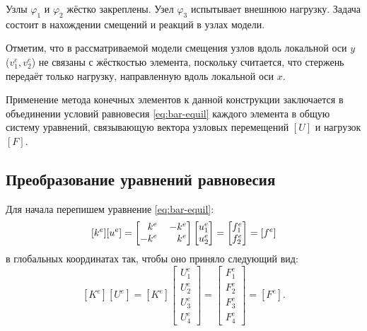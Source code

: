 \documentclass[10pt]{article}
\numberwithin{equation}{section}
\renewcommand{\phi}{\varphi}
\newcommand{\matr}[1]{[#1]}
\newcommand{\node}[1]{$\phi_{#1}$}
\newcommand{\mm}{\llap{$-$}}
\newcommand{\phm}{\phantom{-}}
\begin{document}


Узлы \node{1} и \node{2} жёстко закреплены. Узел \node{3} испытывает
внешнюю нагрузку. Задача состоит в нахождении смещений и реакций в
узлах модели.

Отметим, что в рассматриваемой модели смещения узлов вдоль локальной
оси $y$ ($v_1^e, v_2^e$) не связаны с жёсткостью элемента, поскольку
считается, что стержень передаёт только нагрузку, направленную вдоль
локальной оси $x$.

Применение метода конечных элементов к данной конструкции заключается
в объединении условий равновесия \eqref{eq:bar-equil} каждого элемента
в общую систему уравнений, связывающую вектора узловых перемещений
$\matr{U}$ и нагрузок $\matr{F}$.

\subsection{Преобразование уравнений равновесия}

Для начала перепишем уравнение \eqref{eq:bar-equil}:
\begin{equation}
  \label{eq:bar-element-equil}
  \matr{k^e}\matr{u^e}=
  \begin{bmatrix}
    \phm{}k^e&& \mm k^e\\
    -k^e && k^e    
  \end{bmatrix}
  \begin{bmatrix}
    u_1^e\\
    u_2^e
  \end{bmatrix}
  =
  \begin{bmatrix}
    f_1^e\\
    f_2^e
  \end{bmatrix}=\matr{f^e}
\end{equation}
в глобальных координатах так, чтобы оно приняло следующий вид:
\begin{equation}
  \label{eq:target-equil}
  \matr{K^e}\matr{U^e}=\matr{K^e}
  \begin{bmatrix}
    U_1^e\\
    U_2^e\\
    U_3^e\\
    U_4^e
  \end{bmatrix}
  =
  \begin{bmatrix}
    F_1^e\\
    F_2^e\\
    F_3^e\\
    F_4^e
  \end{bmatrix}=\matr{F^e}.
\end{equation}
\end{document}
